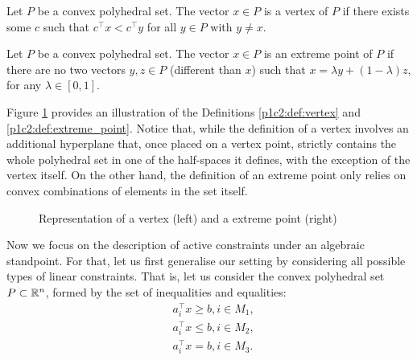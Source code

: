 \begin{definition}[Vertex] \label{p1c2:def:vertex}
	Let $P$ be a convex polyhedral set. The vector $x \in P$ is a vertex of $P$ if there exists some $c$ such that $c^\top x < c^\top y$ for all $y \in P$ with $y \neq x$.
\end{definition}

\begin{definition}\label{p1c2:def:extreme_point}
	Let $P$ be a convex polyhedral set. The vector $x \in P$ is an extreme point of $P$ if there are no two vectors $y,z \in P$ (different than $x$) such that $x = \lambda y + (1 - \lambda)z$, for any $\lambda \in [0,1]$.
\end{definition}

Figure \ref{p1c2:fig:vertex_and_extreme_point} provides an illustration of the Definitions \ref{p1c2:def:vertex} and \ref{p1c2:def:extreme_point}. Notice that, while the definition of a vertex involves an additional hyperplane that, once placed on a vertex point, strictly contains the whole polyhedral set in one of the half-spaces it defines, with the exception of the vertex itself. On the other hand, the definition of an extreme point only relies on convex combinations of elements in the set itself. 

\begin{figure}
	\caption{Representation of a vertex (left) and a extreme point (right)} \label{p1c2:fig:vertex_and_extreme_point}
\end{figure}	

Now we focus on the description of active constraints under an algebraic standpoint. For that, let us first generalise our setting by considering all possible types of linear constraints. That is, let us consider the convex polyhedral set $P \subset \mathbb{R}^n$, formed by the set of inequalities and equalities:
%
\begin{align*}
	& a_i^\top x \geq b, i \in M_1, \\ 
	& a_i^\top x \leq b, i \in M_2, \\
	& a_i^\top x = b, i \in M_3.
\end{align*}

